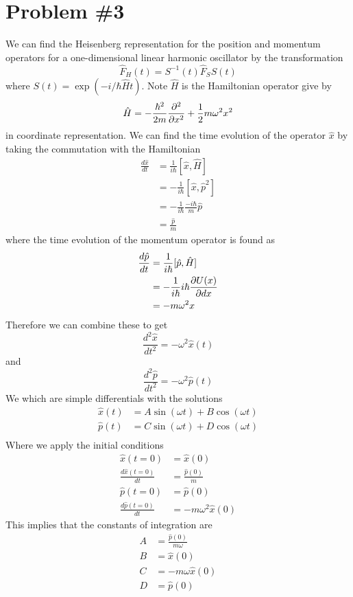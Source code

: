 \documentclass[11pt]{article}
\numberwithin{equation}{section}
\begin{document}
\pagebreak

\section{Problem \#3}
We can find the Heisenberg representation for the position and momentum operators for a 
one-dimensional linear harmonic oscillator by the
transformation 
$$\hat{F}_{H}(t) = S^{-1}(t)\hat{F}_{S}S(t)$$
where $S(t) = \exp(-i/\hbar\hat{H}t)$. Note $\hat{H}$ is the Hamiltonian operator give by
$$\hat{H} = -\frac{\hbar^2}{2m}\frac{\partial{^2}}{\partial{x^2}} + \frac{1}{2}m\omega^2x^2$$
in coordinate representation. We can find the time evolution of the operator $\hat{x}$ by
taking the commutation with the Hamiltonian
\begin{align*}
\frac{d\hat{x}}{dt} &= \frac{1}{i\hbar}[\hat{x},\hat{H}]\\
&= -\frac{1}{i\hbar}[\hat{x},\hat{p}^2]\\
&= -\frac{1}{i\hbar}\frac{-i\hbar}{m}\hat{p}\\
&= \frac{\hat{p}}{m}
\end{align*}
where the time evolution of the momentum operator is found as
\begin{align*}
\frac{d\hat{p}}{dt} &= \frac{1}{i\hbar}[\hat{p},\hat{H}]\\
&= -\frac{1}{i\hbar}i\hbar\frac{\partial{U(x)}}{\partial{dx}}\\
&= -m\omega^2x
\end{align*}
Therefore we can combine these to get
$$\frac{d^2\hat{x}}{dt^2} = -\omega^2\hat{x}(t)$$
and
$$\frac{d^2\hat{p}}{dt^2} = -\omega^2\hat{p}(t)$$
We which are simple differentials with the solutions
\begin{align*}
\hat{x}(t) &= A\sin(\omega{t}) + B\cos(\omega{t})\\
\hat{p}(t) &= C\sin(\omega{t}) + D\cos(\omega{t})\\
\end{align*}
Where we apply the initial conditions 
\begin{align*}
\hat{x}(t=0) &= \hat{x}(0)\\ 
\frac{d\hat{x}(t=0)}{dt} &= \frac{\hat{p}(0)}{m}\\
\hat{p}(t=0) &= \hat{p}(0)\\
\frac{d\hat{p}(t=0)}{dt} &= -m\omega^2\hat{x}(0)
\end{align*}
This implies that the constants of integration are
\begin{align*}
A &= \frac{\hat{p}(0)}{m\omega}\\
B &= \hat{x}(0)\\
C &= -m\omega\hat{x}(0)\\
D &= \hat{p}(0)
\end{align*}
\end{document}
